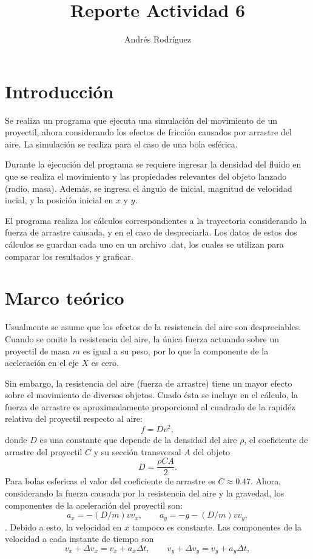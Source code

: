 \documentclass{article}
\title{Reporte Actividad 6}
\author{Andr\'es Rodr\'iguez}
\date{}
\begin{document}
\maketitle

\graphicspath{ {Imagenes/} }



\section{Introducci\'on}
Se realiza un programa que ejecuta una simulaci\'on del movimiento de un proyectil, ahora considerando los efectos de fricci\'on causados por arrastre del aire. La simulaci\'on se realiza para el caso de una bola esf\'erica.

Durante la ejecuci\'on del programa se requiere ingresar la densidad del fluido en que se realiza el movimiento y las propiedades relevantes del objeto lanzado (radio, masa). Adem\'as, se ingresa el \'angulo de inicial, magnitud de velocidad incial, y la posici\'on inicial en $x$ y $y$.

El programa realiza los c\'alculos correspondientes a la trayectoria considerando la fuerza de arrastre causada, y en el caso de despreciarla. Los datos de estos dos c\'alculos se guardan cada uno en un archivo .dat, los cuales se utilizan para comparar los resultados y graficar. \\

\section{Marco te\'orico}
Usualmente se asume que los efectos de la resistencia del aire son despreciables. Cuando se omite la resistencia del aire, la \'unica fuerza actuando sobre un proyectil de masa $m$   es igual a su peso, por lo que la componente de la aceleraci\'on en el eje $X$ es cero.

Sin embargo, la resistencia del aire (fuerza de arrastre) tiene un mayor efecto sobre el movimiento de diversos objetos.  Cuado \'esta se incluye en el c\'alculo, la fuerza de arrastre es aproximadamente proporcional al cuadrado de la rapid\'ez relativa del proyectil respecto al aire:
$$f=Dv^2,$$
donde $D$ es una constante que depende de la densidad del aire $\rho$, el coeficiente de arrastre del proyectil $C$ y su secci\'on transversal $A$ del objeto
$$D=\frac{\rho C A}{2}.$$
Para bolas esfericas el valor del coeficiente de arrastre es $C \approx 0.47$. Ahora, considerando la fuerza causada por la resistencia del aire y la gravedad, los componentes de la aceleraci\'on del proyectil son:
$$a_x=-(D/m)vv_x, \qquad a_y=-g-(D/m)vv_y,$$.
Debido a esto, la velocidad en $x$ tampoco es constante. Las componentes de la velocidad a cada instante de tiempo son
$$v_x + \Delta v_x = v_x + a_x \Delta t, \qquad 
v_y + \Delta v_y = v_y + a_y \Delta t,$$
\end{document}
